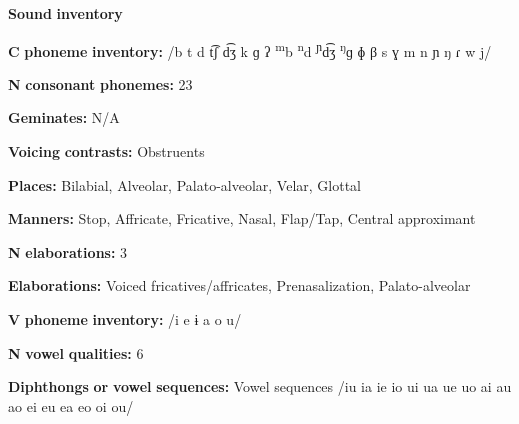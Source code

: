 \documentclass[output=paper]{langsci/langscibook}
\begin{document}
\begin{styleBody}
\textbf{Sound} \textbf{inventory}
\end{styleBody}

\begin{styleBody}
\textbf{C} \textbf{phoneme} \textbf{inventory:} /b t d t͡ʃ d͡ʒ k ɡ ʔ \textsuperscript{m}b \textsuperscript{n}d \textsuperscript{ɲ}d͡ʒ \textsuperscript{ŋ}ɡ ɸ β s ɣ m n ɲ ŋ ɾ w j/
\end{styleBody}

\begin{styleBody}
\textbf{N} \textbf{consonant} \textbf{phonemes:} 23
\end{styleBody}

\begin{styleBody}
\textbf{Geminates:} N/A
\end{styleBody}

\begin{styleBody}
\textbf{Voicing} \textbf{contrasts:} Obstruents
\end{styleBody}

\begin{styleBody}
\textbf{Places:} Bilabial, Alveolar, Palato-alveolar, Velar, Glottal
\end{styleBody}

\begin{styleBody}
\textbf{Manners:} Stop, Affricate, Fricative, Nasal, Flap/Tap, Central approximant
\end{styleBody}

\begin{styleBody}
\textbf{N} \textbf{elaborations:} 3
\end{styleBody}

\begin{styleBody}
\textbf{Elaborations:} Voiced fricatives/affricates, Prenasalization, Palato-alveolar
\end{styleBody}

\begin{styleBody}
\textbf{V} \textbf{phoneme} \textbf{inventory:} /i e ɨ a o u/
\end{styleBody}

\begin{styleBody}
\textbf{N} \textbf{vowel} \textbf{qualities:} 6
\end{styleBody}

\begin{styleBody}
\textbf{Diphthongs} \textbf{or} \textbf{vowel} \textbf{sequences:} Vowel sequences /iu ia ie io ui ua ue uo ai au ao ei eu ea eo oi ou/
\end{styleBody}
\end{document}
